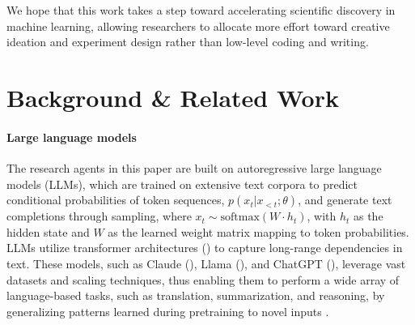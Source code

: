 \documentclass[11pt, a4paper]{gdm_format}
\begin{document}
We hope that this work takes a step toward accelerating scientific discovery in machine learning, allowing researchers to allocate more effort toward creative ideation and experiment design rather than low-level coding and writing.




















\section{Background \& Related Work}

\paragraph{Large language models} 

The research agents in this paper are built on autoregressive large language models (LLMs), which are trained on extensive text corpora to predict conditional probabilities of token sequences, \(p(x_t | x_{<t}; \theta)\), and generate text completions through sampling, where \(x_t \sim \text{softmax}(W \cdot h_t)\), with \(h_t\) as the hidden state and \(W\) as the learned weight matrix mapping to token probabilities. LLMs utilize transformer architectures (\cite{vaswani2017attention}) to capture long-range dependencies in text. These models, such as Claude (\cite{anthropic2024claude}), Llama (\cite{touvron2023llama1,touvron2023llama,dubey2024llama}), and ChatGPT (\cite{hurst2024gpt, openai_gpt3.5, achiam2023gpt}), leverage vast datasets and scaling techniques, thus enabling them to perform a wide array of language-based tasks, such as translation, summarization, and reasoning, by generalizing patterns learned during pretraining to novel inputs \cite{brown2020language}. 
\end{document}
